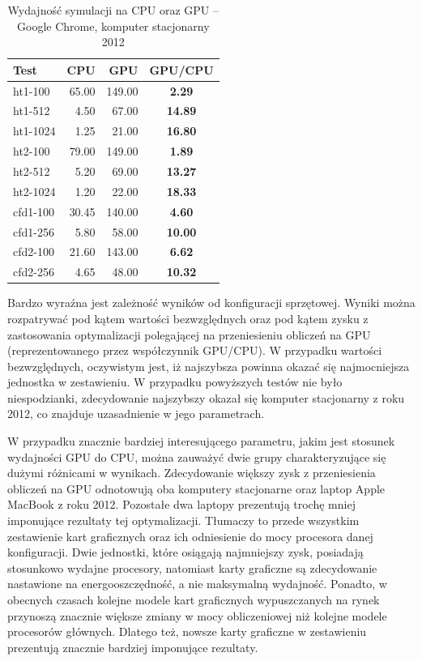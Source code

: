 \clearpage

\begin{table}[!htp]
\caption{Wydajność symulacji na CPU oraz GPU -- Google Chrome, komputer stacjonarny 2012}
\centering
\begin{tabular}{|l|r|r|>{\bfseries}c|}
\hline
\cellcolor{t} Test & \cellcolor{cpu} CPU & \cellcolor{gpu} GPU & \cellcolor{gc} GPU/CPU \\ \hline
ht1-100 & 65.00 & 149.00 & 2.29 \\ \hline
ht1-512 & 4.50 & 67.00 & 14.89 \\ \hline
ht1-1024 & 1.25 & 21.00 & 16.80 \\ \hline
ht2-100 & 79.00 & 149.00 & 1.89 \\ \hline
ht2-512 & 5.20 & 69.00 & 13.27 \\ \hline
ht2-1024 & 1.20 & 22.00 & 18.33 \\ \hline
\hline
cfd1-100 & 30.45 & 140.00 & 4.60 \\ \hline
cfd1-256 & 5.80 & 58.00 & 10.00 \\ \hline
cfd2-100 & 21.60 & 143.00 & 6.62 \\ \hline
cfd2-256 & 4.65 & 48.00 & 10.32 \\ \hline
\end{tabular}
\label{tab:wynikiWebGL_last}
\end{table}

Bardzo wyraźna jest zależność wyników od konfiguracji sprzętowej. Wyniki można
rozpatrywać pod kątem wartości bezwzględnych oraz pod kątem zysku z zastosowania
optymalizacji polegającej na przeniesieniu obliczeń na GPU (reprezentowanego
przez współczynnik GPU/CPU). W przypadku wartości bezwzględnych, oczywistym
jest, iż najszybsza powinna okazać się najmocniejsza jednostka w zestawieniu. W
przypadku powyższych testów nie było niespodzianki, zdecydowanie najszybszy
okazał się komputer stacjonarny z roku 2012, co znajduje uzasadnienie w jego
parametrach.

W przypadku znacznie bardziej interesującego parametru, jakim jest stosunek
wydajności GPU do CPU, można zauważyć dwie grupy charakteryzujące się dużymi
różnicami w wynikach. Zdecydowanie większy zysk z przeniesienia obliczeń na GPU
odnotowują oba komputery stacjonarne oraz laptop Apple MacBook z roku 2012.
Pozostałe dwa laptopy prezentują trochę mniej imponujące rezultaty tej
optymalizacji. Tłumaczy to przede wszystkim zestawienie kart graficznych oraz
ich odniesienie do mocy procesora danej konfiguracji. Dwie jednostki, które
osiągają najmniejszy zysk, posiadają stosunkowo wydajne procesory, natomiast
karty graficzne są zdecydowanie nastawione na energooszczędność, a nie
maksymalną wydajność. Ponadto, w obecnych czasach kolejne modele kart
graficznych wypuszczanych na rynek przynoszą znacznie większe zmiany w mocy
obliczeniowej niż kolejne modele procesorów głównych. Dlatego też, nowsze karty
graficzne w zestawieniu prezentują znacznie bardziej imponujące rezultaty.

